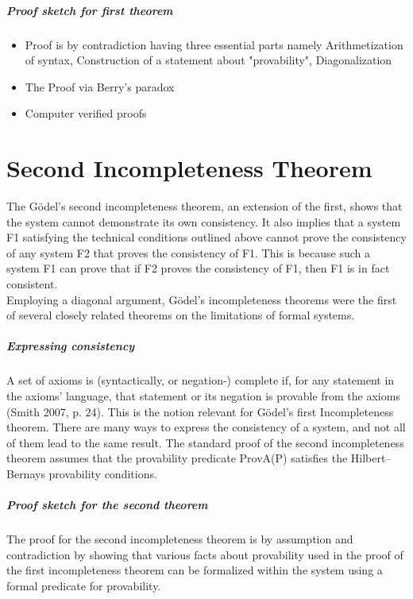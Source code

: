 \documentclass[10pt,a4paper,twoside]{article}
\begin{document}
\subparagraph{Proof sketch for first theorem}
\begin{itemize}
\item Proof is by contradiction having three essential parts namely Arithmetization of syntax, Construction of a statement about "provability", Diagonalization
\item The Proof via Berry's paradox
\item Computer verified proofs
\end{itemize}
\section{Second Incompleteness Theorem}
The Gödel's second incompleteness theorem, an extension of the first, shows that the system cannot demonstrate its own consistency. It also implies that a system F1 satisfying the technical conditions outlined above cannot prove the consistency of any system F2 that proves the consistency of F1. This is because such a system F1 can prove that if F2 proves the consistency of F1, then F1 is in fact consistent.\\
Employing a diagonal argument, Gödel's incompleteness theorems were the first of several closely related theorems on the limitations of formal systems.

\subparagraph{Expressing consistency}
A set of axioms is (syntactically, or negation-) complete if, for any statement in the axioms' language, that statement or its negation is provable from the axioms (Smith 2007, p.  24). This is the notion relevant for Gödel's first Incompleteness theorem.
There are many ways to express the consistency of a system, and not all of them lead to the same result. The standard proof of the second incompleteness theorem assumes that the provability predicate ProvA(P) satisfies the Hilbert–Bernays provability conditions.

\subparagraph{Proof sketch for the second theorem}
The proof for the second incompleteness theorem is by assumption and contradiction by showing that various facts about provability used in the proof of the first incompleteness theorem can be formalized within the system using a formal predicate for provability.
\end{document}
